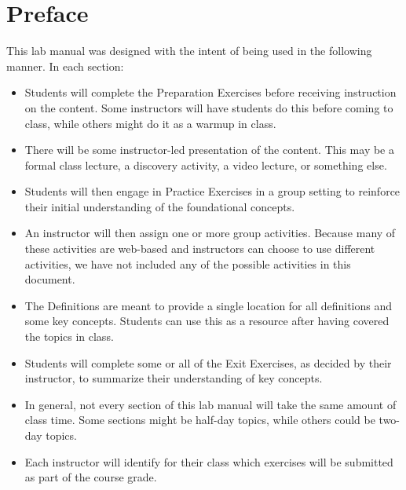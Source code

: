 


\setcounter{chapter}{-1} 
\chapter{Preface}  \label{chapter-preface}


This lab manual was designed with the intent of being used in the following manner.  In each section:
\begin{itemize}
	\item Students will complete the Preparation Exercises before receiving instruction on the content.  Some instructors will have students do this before coming to class, while others might do it as a warmup in class.
	\item There will be some instructor-led presentation of the content.  This may be a formal class lecture, a discovery activity, a video lecture, or something else.
	\item Students will then engage in Practice Exercises in a group setting to reinforce their initial understanding of the foundational concepts.
	\item An instructor will then assign one or more group activities.  Because many of these activities are web-based and instructors can choose to use different activities, we have not included any of the possible activities in this document. 
	\item The Definitions are meant to provide a single location for all definitions and some key concepts.  Students can use this as a resource after having covered the topics in class.
	\item Students will complete some or all of the Exit Exercises, as decided by their instructor, to summarize their understanding of key concepts.
	\item In general, not every section of this lab manual will take the same amount of class time.  Some sections might be half-day topics, while others could be two-day topics.	
	\item Each instructor will identify for their class which exercises will be submitted as part of the course grade.
\end{itemize}
~

